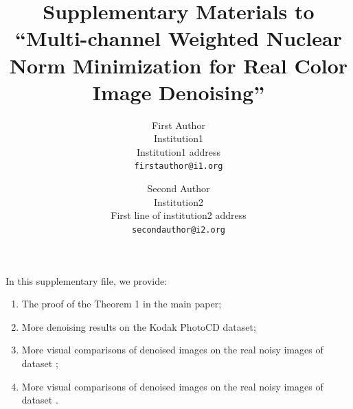\documentclass[10pt,onecolumn,letterpaper]{article}
\begin{document}
\title{Supplementary Materials to ``Multi-channel Weighted Nuclear Norm Minimization for Real Color Image Denoising''}

\author{First Author\\
Institution1\\
Institution1 address\\
{\tt\small firstauthor@i1.org}
\and
Second Author\\
Institution2\\
First line of institution2 address\\
{\tt\small secondauthor@i2.org}
}

\maketitle


In this supplementary file, we provide:\vspace{-2mm}
\begin{enumerate}
\item The proof of the Theorem 1 in the main paper;
\vspace{-2mm}
\item More denoising results on the Kodak PhotoCD dataset;
\vspace{-2mm}
\item More visual comparisons of denoised images on the real noisy images of dataset \cite{ncwebsite}; 
\vspace{-2mm}
\item More visual comparisons of denoised images on the real noisy images of dataset \cite{crosschannel2016}.
\end{enumerate}
\end{document}
